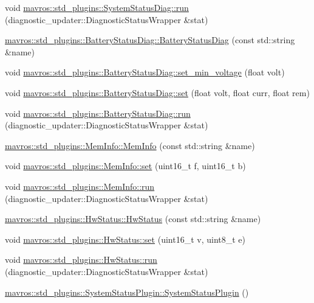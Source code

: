 \begin{DoxyCompactItemize}
void \mbox{\hyperlink{group__plugin_ga41ef975786e414cd2a33deb33de19847}{mavros\+::std\+\_\+plugins\+::\+System\+Status\+Diag\+::run}} (diagnostic\+\_\+updater\+::\+Diagnostic\+Status\+Wrapper \&stat)
\item 
\mbox{\hyperlink{group__plugin_ga358227b10fadcdf347eed8f7a8dc5019}{mavros\+::std\+\_\+plugins\+::\+Battery\+Status\+Diag\+::\+Battery\+Status\+Diag}} (const std\+::string \&name)
\item 
void \mbox{\hyperlink{group__plugin_ga14df10d83c18abee5b5d9e4fd14d67d0}{mavros\+::std\+\_\+plugins\+::\+Battery\+Status\+Diag\+::set\+\_\+min\+\_\+voltage}} (float volt)
\item 
void \mbox{\hyperlink{group__plugin_ga09ec2111cd2db38d3c68c2f0263dfc00}{mavros\+::std\+\_\+plugins\+::\+Battery\+Status\+Diag\+::set}} (float volt, float curr, float rem)
\item 
void \mbox{\hyperlink{group__plugin_ga7db23723842e4a269592a178d8ab06ef}{mavros\+::std\+\_\+plugins\+::\+Battery\+Status\+Diag\+::run}} (diagnostic\+\_\+updater\+::\+Diagnostic\+Status\+Wrapper \&stat)
\item 
\mbox{\hyperlink{group__plugin_gad4fb422808df0eb7e17e9ec98f16a95d}{mavros\+::std\+\_\+plugins\+::\+Mem\+Info\+::\+Mem\+Info}} (const std\+::string \&name)
\item 
void \mbox{\hyperlink{group__plugin_ga43594790e090ecc310c3dce79003bba5}{mavros\+::std\+\_\+plugins\+::\+Mem\+Info\+::set}} (uint16\+\_\+t f, uint16\+\_\+t b)
\item 
void \mbox{\hyperlink{group__plugin_gaa1dfbb09b0fa4ddd991b8e4ec012767c}{mavros\+::std\+\_\+plugins\+::\+Mem\+Info\+::run}} (diagnostic\+\_\+updater\+::\+Diagnostic\+Status\+Wrapper \&stat)
\item 
\mbox{\hyperlink{group__plugin_ga11b96d7caa88529a91eb7955a253d331}{mavros\+::std\+\_\+plugins\+::\+Hw\+Status\+::\+Hw\+Status}} (const std\+::string \&name)
\item 
void \mbox{\hyperlink{group__plugin_ga8d117525ad76f5d494bf0ec2874d9fa2}{mavros\+::std\+\_\+plugins\+::\+Hw\+Status\+::set}} (uint16\+\_\+t v, uint8\+\_\+t e)
\item 
void \mbox{\hyperlink{group__plugin_gaa8ece83db94ffbadf4bcf7a5e5e501a4}{mavros\+::std\+\_\+plugins\+::\+Hw\+Status\+::run}} (diagnostic\+\_\+updater\+::\+Diagnostic\+Status\+Wrapper \&stat)
\item 
\mbox{\hyperlink{group__plugin_ga93652f33205dc610638618b43a6addbc}{mavros\+::std\+\_\+plugins\+::\+System\+Status\+Plugin\+::\+System\+Status\+Plugin}} ()

\end{DoxyCompactItemize}

